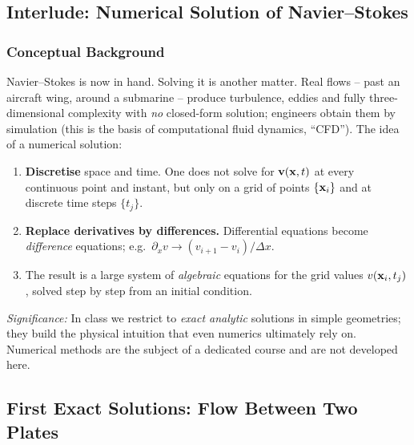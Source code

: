 \documentclass[../main.tex]{subfiles}
\begin{document}
\subsection{Interlude: Numerical Solution of Navier--Stokes}\label{sec:lec19:numerics}

\subsubsection*{Conceptual Background}
Navier--Stokes is now in hand. Solving it is another matter. Real flows -- past an aircraft wing, around a submarine -- produce turbulence, eddies and fully three-dimensional complexity with \emph{no} closed-form solution; engineers obtain them by simulation (this is the basis of computational fluid dynamics, ``CFD''). The idea of a numerical solution:
\begin{enumerate}
  \item \textbf{Discretise} space and time. One does not solve for $\mathbf{v}(\mathbf{x},t)$ at every continuous point and instant, but only on a grid of points $\{\mathbf{x}_i\}$ and at discrete time steps $\{t_j\}$.
  \item \textbf{Replace derivatives by differences.} Differential equations become \emph{difference} equations; e.g.\ $\partial_x v\to (v_{i+1}-v_i)/\Delta x$.
  \item The result is a large system of \emph{algebraic} equations for the grid values $v(\mathbf{x}_i,t_j)$, solved step by step from an initial condition.
\end{enumerate}
\textit{Significance:} In class we restrict to \emph{exact analytic} solutions in simple geometries; they build the physical intuition that even numerics ultimately rely on. Numerical methods are the subject of a dedicated course and are not developed here.

\subsection{First Exact Solutions: Flow Between Two Plates}\label{sec:lec19:channel}
\end{document}
